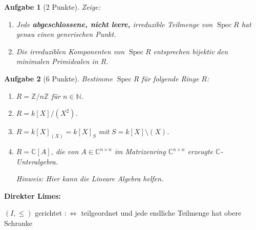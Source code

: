 \documentclass[a4paper, 12pt, numbers=noendperiod, chapterprefix=true]{scrbook}
\theoremstyle{break}
\newtheorem{Aufg}{Aufgabe}
\theoremstyle{nonumberbreak}
\theoremstyle{nonumberplain}
\DeclareMathOperator{\Spec}{Spec}
\newcommand{\C}{\mathbb{C}}
\newcommand{\N}{\mathbb{N}}
\newcommand{\Z}{\mathbb{Z}}
\begin{document}
\begin{Aufg}[2 Punkte]
 Zeige:
\begin{enumerate}%
 \item Jede \textbf{abgeschlossene, nicht leere,} irreduzible Teilmenge von $\Spec R$ hat genau einen generischen Punkt.
 \item Die irreduziblen Komponenten von $\Spec R$ entsprechen bijektiv den minimalen Primidealen in $R$.
\end{enumerate}
\end{Aufg}

\begin{Aufg}[6 Punkte]
 Bestimme $\Spec R$ f\"ur folgende Ringe $R$:
\begin{enumerate}%
 \item $R = \Z/n\!\Z$ f\"ur $n\in \N$.
 \item $R = k[X]/(X^2)$.
 \item $R = k[X]_{(X)} = k[X]_S$ mit $S = k[X]\setminus(X)$.
 \item $R = \C[A]$, die von $A\in \C^{n\times n}$ im Matrizenring $\C^{n\times n}$ erzeugte $\C$-Unteralgebra.
 
 \textit{Hinweis: Hier kann die Lineare Algebra helfen.}
\end{enumerate}
\end{Aufg}

\textbf{Direkter Limes:}

$(I, \le)$ gerichtet $:\Leftrightarrow$ teilgeordnet und jede endliche Teilmenge hat obere Schranke
\end{document}

